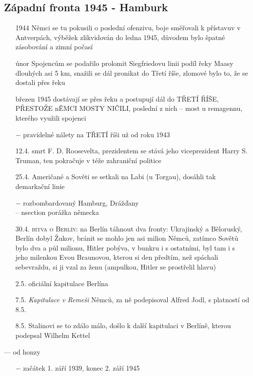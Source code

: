 \documentclass{article}
\begin{document}
\subsection*{Západní fronta 1945 - Hamburk}
\begin{itemize}
    \vspace{-0.5em}
    \setlength\itemsep{0.15em}
    \item[1944] Němci se tu pokusili o poslední ofenzivu, boje směřovali k přístavuv v Antverpách, výběžek zlikvidován do ledna 1945, důvodem bylo špatné zásobování a zimní počasí
    \item[únor] Spojencům se podařilo prolomit Siegfriedovu linii podíl řeky Maasy dlouhých asi 5 km, snažili se dál pronikat do Třetí říše, zlomové bylo to, že se dostali přes řeku
    \item[březen 1945] dostávají se přes řeku a postupují dál do TŘETÍ ŘÍŠE, PŘESTOŽE nĚMCI MOSTY NIČILI, poslední z nich -- most u remagennu, kterého využili spojenci
    \item[$-$] pravidelné nálety na TŘETÍ říši už od roku 1943
    \item[12.4.] smrt F. D. Roosevelta, prezidentem se stává jeho viceprezident Harry S. Truman, ten pokračuje v téže zahraniční politice
    \item[25.4.] Američané a Sověti se setkali na Labi (u Torgau), dosáhli tak demarkační linie
    \item[$-$] rozbombardovaný Hamburg, Drážďany\\
    -- nsection porážka německa
    \item[30.4.] \textsc{bitva o Berlín}: na Berlín táhnout dva fronty: Ukrajinský a Běloruský, Berlín dobyl Žukov, bránit se mohlo jen asi milion Němců, zatímco Sovětů bylo dva a půl milionu, Hitler pobýva, v bunkru i s ostatními, byl tam i s jeho milenkou Evou Braunovou, kterou si den předtím, než spáchali sebevraždu, si ji vzal za ženu (ampulkou, Hitler se prostřelil hlavu)
    \item[2.5.] oficiální kapitulace Berlína
    \item[7.5.] \textit{Kapitulace v Remeši} Němců, za ně podepisoval Alfred Jodl, s platností od 8.5.
    \item[8.5.] Stalinovi se to zdálo málo, došlo k další kapitulaci v Berlíně, kterou podepsal Wilhelm Kettel
\end{itemize}

--- od honzy

\begin{itemize}
    \vspace{-0.5em}
    \setlength\itemsep{0.15em}
    \item[$-$] začátek 1. září 1939, konec 2. září 1945
\end{itemize}
\end{document}
